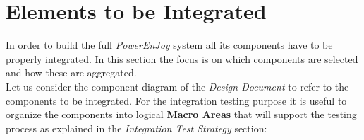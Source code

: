 \documentclass[11pt,a4paper]{report}
\begin{document}
\section{Elements to be Integrated}
In order to build the full \textit{PowerEnJoy} system all its components have to be properly integrated. In this section the focus is on which components are selected and how these are aggregated.\\Let us consider the component diagram of the \textit{Design Document} to refer to the components to be integrated. For the integration testing purpose it is useful to organize the components into logical \textbf{Macro Areas} that will support the testing process as explained in the \textit{Integration Test Strategy} section:
\end{document}
